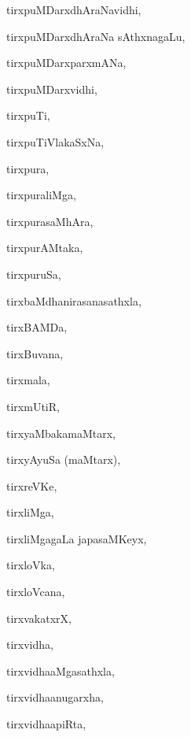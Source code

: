 \begin{multicols}{3}
{\noindent
{tirxpuMDarxdhAraNavidhi}, \pageref{tirxpuMDarxdhAraNavidhi}

\noindent
{tirxpuMDarxdhAraNa sAthxna\-gaLu}, \pageref{tirxpuMDarxdhAraNa sAthxnagaLu}

\noindent
{tirxpuMDarxparxmANa}, \pageref{tirxpuMDarxparxmANa}

\noindent
{tirxpuMDarxvidhi}, \pageref{tirxpuMDarxvidhi}

\noindent
{tirxpuTi}, \pageref{tirxpuTi}

\noindent
{tirxpuTiVlakaSxNa}, \pageref{tirxpuTiVlakaSxNa}

\noindent
{tirxpura}, \pageref{tirxpura}

\noindent
{tirxpuraliMga}, \pageref{tirxpuraliMga}

\noindent
{tirxpurasaMhAra}, \pageref{tirxpurasaMhAra}

\noindent
{tirxpurAMtaka}, \pageref{tirxpurAMtaka}

\noindent
{tirxpuruSa}, \pageref{tirxpuruSa}

\noindent
{tirxbaMdhanirasanasathxla}, \pageref{tirxbaMdhanirasanasathxla}

\noindent
{tirxBAMDa}, \pageref{tirxBAMDa}

\noindent
{tirxBuvana}, \pageref{tirxBuvana}

\noindent
{tirxmala}, \pageref{tirxmala}

\noindent
{tirxmUtiR}, \pageref{tirxmUtiR}

\noindent
{tirxyaMbakamaMtarx}, \pageref{tirxyaMbakamaMtarx}

\noindent
{tirxyAyuSa (maMtarx)}, \pageref{tirxyAyuSa maMtarx}

\noindent
{tirxreVKe}, \pageref{tirxreVKe}

\noindent
{tirxliMga}, \pageref{tirxliMga}

\noindent
{tirxliMgagaLa japasaMKeyx}, \pageref{tirxliMgagaLa japasaMKeyx}

\noindent
{tirxloVka}, \pageref{tirxloVka}

\noindent
{tirxloVcana}, \pageref{tirxloVcana}

\noindent
{tirxvakatxrX}, \pageref{tirxvakatxrX}

\noindent
{tirxvidha}, \pageref{tirxvidha}

\noindent
{tirxvi{dha}aMgasathxla}, \pageref{tirxvidhaaMgasathxla}

\noindent
{tirxvi{dha}anugarxha}, \pageref{tirxvidhaanugarxha}

\noindent
{tirxvi{dha}apiRta}, \pageref{tirxvidhaapiRta}

}
\end{multicols}
